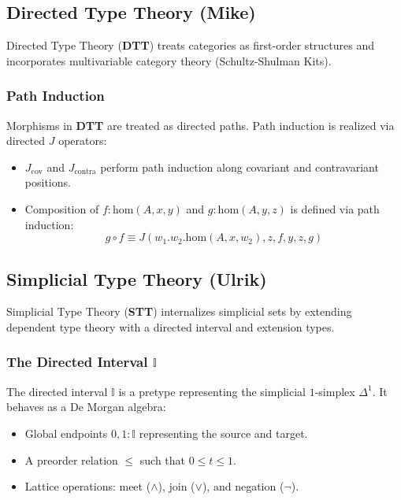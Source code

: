 \documentclass[11pt]{article}
\newcommand{\stt}[0]{\textbf{STT}}
\newcommand{\dtt}[0]{\textbf{DTT}}
\newcommand{\homtype}[3]{\text{hom}(#1, #2, #3)}
\begin{document}
\subsection{Directed Type Theory (Mike)}

Directed Type Theory (\dtt{}) treats categories as first-order structures and incorporates multivariable category theory (Schultz-Shulman Kits).

\subsubsection{Path Induction}
Morphisms in \dtt{} are treated as directed paths. Path induction is realized via directed $J$ operators:
\begin{itemize}
    \item $J_\text{cov}$ and $J_\text{contra}$ perform path induction along covariant and contravariant positions.
    \item Composition of $f : \homtype{A}{x}{y}$ and $g : \homtype{A}{y}{z}$ is defined via path induction:
    \begin{equation}
        g \circ f \equiv J(w_1.w_2.\homtype{A}{x}{w_2}, z, f, y, z, g)
    \end{equation}
\end{itemize}

\subsection{Simplicial Type Theory (Ulrik)}

Simplicial Type Theory (\stt{}) internalizes simplicial sets by extending dependent type theory with a directed interval and extension types.

\subsubsection{The Directed Interval $\mathbb{I}$}
The directed interval $\mathbb{I}$ is a pretype representing the simplicial $1$-simplex $\Delta^1$. It behaves as a De Morgan algebra:
\begin{itemize}
    \item Global endpoints $0, 1 : \mathbb{I}$ representing the source and target.
    \item A preorder relation $\le$ such that $0 \le t \le 1$.
    \item Lattice operations: meet ($\wedge$), join ($\vee$), and negation ($\neg$).
\end{itemize}
\end{document}
